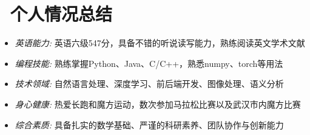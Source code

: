 \documentclass{../../styles/resume}
\begin{document}
\section{\faInfo\ 个人情况总结}
\begin{itemize}
  \item \textit{英语能力:} 英语六级547分，具备不错的听说读写能力，熟练阅读英文学术文献
  \item \textit{编程技能:} 熟练掌握Python、Java、C/C++，熟悉numpy、torch等用法
  \item \textit{技术领域:} 自然语言处理、深度学习、前后端开发、图像处理、语义分析
  \item \textit{身心健康:} 热爱长跑和魔方运动，数次参加马拉松比赛以及武汉市内魔方比赛
  \item \textit{综合素质:} 具备扎实的数学基础、严谨的科研素养、团队协作与创新能力
\end{itemize}
\end{document}
